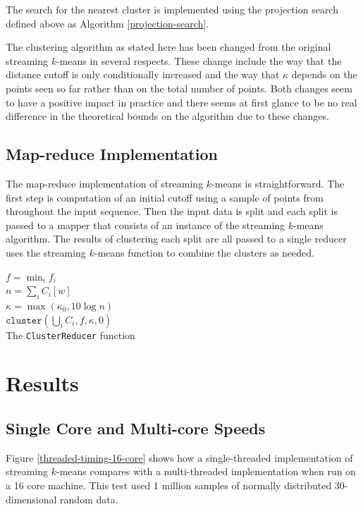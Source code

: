 \documentclass[11pt]{amsart}
\begin{document}
The search for the nearest cluster is implemented using the projection search defined above as Algorithm \ref{projection-search}.

The clustering algorithm as stated here has been changed from the original streaming $k$-means in several respects.  These change include the way that the distance cutoff is only conditionally increased and the way that $\kappa$ depends on the points seen so far rather than on the total number of points.  Both changes seem to have a positive impact in practice and there seems at first glance to be no real difference in the theoretical bounds on the algorithm due to these changes.
\subsection{Map-reduce Implementation}

The map-reduce implementation of streaming $k$-means is straightforward.  The first step is computation of an initial cutoff using a sample of points from throughout the input sequence.  Then the input data is split and each split is passed to a mapper that consists of an instance of the streaming $k$-means algorithm.  The results of clustering each split are all passed to a single reducer uses the streaming $k$-means function to combine the clusters as needed.

\begin{algorithm}[H]
\SetNoFillComment
{}
$f = \min_i f_i$ \\
$n = \sum_i C_i[w]$\\
$\kappa = \max\left(\kappa_0, 10 \log n \right)$\\
\Return $ \mathtt {cluster}( \bigcup_i C_i, f, \kappa, 0)$\\
\caption{The {\tt ClusterReducer} function}
\end{algorithm}
\section{Results}

\subsection{Single Core and Multi-core Speeds}

Figure \ref{threaded-timing-16-core} shows how a single-threaded implementation of streaming $k$-means compares with a multi-threaded implementation when run on a 16 core machine.  This test used 1 million samples of normally distributed 30-dimensional random data.  
\end{document}
